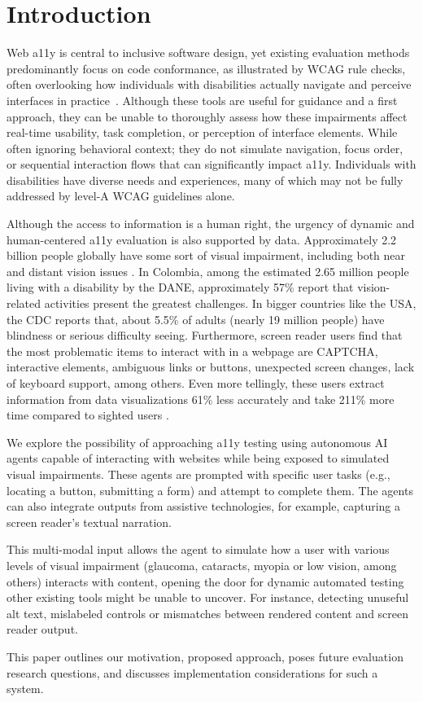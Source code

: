 
\section{Introduction}

Web \ac{a11y} is central to inclusive software design, yet existing evaluation methods predominantly focus on code conformance, as illustrated by \ac{WCAG} rule checks, often overlooking how individuals with disabilities actually navigate and perceive interfaces in practice~\cite{ara2024inclusive}. Although these tools are useful for guidance and a first approach, they can be unable to thoroughly assess how these impairments affect real-time usability, task completion, or perception of interface elements. While often ignoring behavioral context; they do not simulate navigation, focus order, or sequential interaction flows that can significantly impact \ac{a11y}. Individuals with disabilities have diverse needs and experiences, many of which may not be fully addressed by level-A \ac{WCAG} guidelines alone.

Although the access to information is a human right, the urgency of dynamic and human-centered \ac{a11y} evaluation is also supported by data. Approximately 2.2 billion people globally have some sort of visual impairment, including both near and distant vision issues \cite{who2023vision}. In Colombia, among the estimated 2.65 million people living with a disability by the DANE, approximately 57\% report that vision-related activities present the greatest challenges\cite{DANE2022}. In bigger countries like the USA, the CDC reports that, about 5.5\% of adults (nearly 19 million people) have blindness or serious difficulty seeing\cite{cdc2025disabilities}. Furthermore, screen reader users find that the most problematic items to interact with in a webpage are CAPTCHA, interactive elements, ambiguous links or buttons, unexpected screen changes, lack of keyboard support, among others\cite{webaimsurvey2025}. Even more tellingly, these users extract information from data visualizations 61\% less accurately and take 211\% more time compared to sighted users \cite{wobbrock2021assets}.

We explore the possibility of approaching \ac{a11y} testing using autonomous \ac{AI} agents capable of interacting with websites while being exposed to simulated visual impairments. These agents are prompted with specific user tasks (e.g., locating a button, submitting a form) and attempt to complete them. The agents can also integrate outputs from assistive technologies, for example, capturing a screen reader's textual narration. 

This multi-modal input allows the agent to simulate how a user with various levels of visual impairment (glaucoma, cataracts, myopia or low vision, among others) interacts with content, opening the door for dynamic automated testing other existing tools might be unable to uncover. For instance, detecting unuseful alt text, mislabeled controls or mismatches between rendered content and screen reader output. 

This paper outlines our motivation, proposed approach, poses future evaluation research questions, and discusses implementation considerations for such a system.
